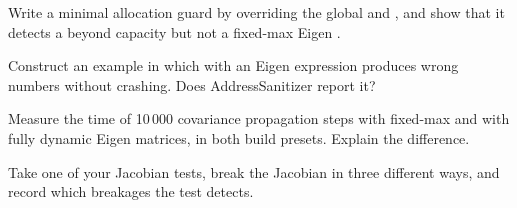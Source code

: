 \begin{exercises}
  \item Write a minimal allocation guard by overriding the global  and , and show that it detects a
         beyond capacity but not a fixed-max Eigen .
  \item Construct an example in which  with an Eigen expression produces wrong numbers without crashing. Does
        AddressSanitizer report it?
  \item Measure the time of 10\,000 covariance propagation steps with fixed-max and with fully dynamic Eigen matrices, in both build
        presets. Explain the difference.
  \item Take one of your Jacobian tests, break the Jacobian in three different ways, and record which breakages the test detects.
\end{exercises}
